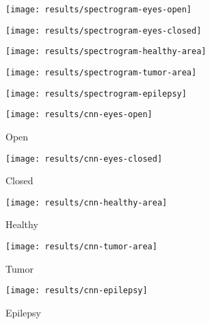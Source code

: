 \documentclass[conference]{IEEEtran}
\begin{document}
\begin{figure*}[!t]
	\begin{subfigure}{0.19\linewidth}
		\centering
		\texttt{[image: results/spectrogram-eyes-open]}
	\end{subfigure}
	\begin{subfigure}{0.19\linewidth}
		\centering
		\texttt{[image: results/spectrogram-eyes-closed]}
	\end{subfigure}
	\begin{subfigure}{0.19\linewidth}
		\centering
		\texttt{[image: results/spectrogram-healthy-area]}
	\end{subfigure}
	\begin{subfigure}{0.19\linewidth}
		\centering
		\texttt{[image: results/spectrogram-tumor-area]}
	\end{subfigure}
	\begin{subfigure}{0.19\linewidth}
		\centering
		\texttt{[image: results/spectrogram-epilepsy]}
	\end{subfigure}

	\begin{subfigure}{0.19\linewidth}
		\centering
		\texttt{[image: results/cnn-eyes-open]}
		\caption{Open}
	\end{subfigure}
	\begin{subfigure}{0.19\linewidth}
		\centering
		\texttt{[image: results/cnn-eyes-closed]}
		\caption{Closed}
	\end{subfigure}
	\begin{subfigure}{0.19\linewidth}
		\centering
		\texttt{[image: results/cnn-healthy-area]}
		\caption{Healthy}
	\end{subfigure}
	\begin{subfigure}{0.19\linewidth}
		\centering
		\texttt{[image: results/cnn-tumor-area]}
		\caption{Tumor}
	\end{subfigure}
	\begin{subfigure}{0.19\linewidth}
		\centering
		\texttt{[image: results/cnn-epilepsy]}
		\caption{Epilepsy}
	\end{subfigure}
	\caption{Visualizations of the original signals and the outputs of the S2Is for each class.
	The x, y-axis of the first row are in \SI{}{\micro V} and time samples respectively.
	The x, y-axis of the rest of the subfigures denote spatial information, since we do not inform the `base model' the concept of time along the x-axis or the concept of frequency along the y-axis.
	Higher pixel intensity denotes higher amplitude.}
	\label{fig:signal2imageoutputs}
\end{figure*}
\end{document}
